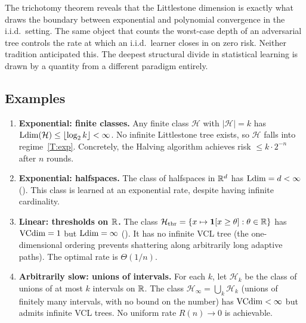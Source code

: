 The trichotomy theorem reveals that the Littlestone dimension is exactly what
draws the boundary between exponential and polynomial convergence in the
i.i.d.\ setting.  The same object that counts the worst-case depth of an
adversarial tree controls the rate at which an i.i.d.\ learner closes in on
zero risk.  Neither tradition anticipated this.  The deepest structural divide
in statistical learning is drawn by a quantity from a different paradigm entirely.

\subsection{Examples}
\label{sec:trichotomy-examples}

\begin{example}
\label{ex:three-regimes}
\begin{enumerate}[label=(\alph*),leftmargin=*,itemsep=4pt]
\item \textbf{Exponential: finite classes.}  Any finite class
  $\mathcal{H}$ with $|\mathcal{H}| = k$ has
  $\mathrm{Ldim}(\mathcal{H}) \leq \lfloor\log_2 k\rfloor < \infty$.  No infinite
  Littlestone tree exists, so $\mathcal{H}$ falls into regime~\ref{T:exp}.
  Concretely, the Halving algorithm achieves risk $\leq k \cdot 2^{-n}$
  after $n$ rounds.

\item \textbf{Exponential: halfspaces.}  The class of halfspaces in
  $\mathbb{R}^d$ has $\mathrm{Ldim} = d < \infty$ ().  This class
  is learned at an exponential rate, despite having infinite cardinality.

\item \textbf{Linear: thresholds on $\mathbb{R}$.}  The class
  $\mathcal{H}_{\mathrm{thr}} = \{x \mapsto \mathbf{1}[x \geq \theta] :
  \theta \in \mathbb{R}\}$ has $\mathrm{VCdim} = 1$ but $\mathrm{Ldim} = \infty$
  ().  It has no infinite VCL tree (the
  one-dimensional ordering prevents shattering along arbitrarily long
  adaptive paths).  The optimal rate is $\Theta(1/n)$.

\item \textbf{Arbitrarily slow: unions of intervals.}  For each $k$, let
  $\mathcal{H}_k$ be the class of unions of at most $k$ intervals on $\mathbb{R}$.
  The class $\mathcal{H}_\infty = \bigcup_k \mathcal{H}_k$ (unions of
  finitely many intervals, with no bound on the number) has
  $\mathrm{VCdim} < \infty$ but admits infinite VCL trees.  No uniform rate $R(n) \to 0$
  is achievable.
\end{enumerate}
\end{example}


